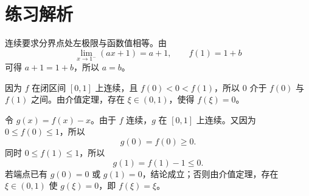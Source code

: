 \section{练习解析}

\begin{solutionbox}[title={第 1 题}]
连续要求分界点处左极限与函数值相等。由
\[
  \lim_{x\to 1^-}(ax+1)=a+1,\qquad f(1)=1+b
\]
可得 $a+1=1+b$，所以 $a=b$。
\end{solutionbox}

\begin{solutionbox}[title={第 2 题}]
因为 $f$ 在闭区间 $[0,1]$ 上连续，且 $f(0)<0<f(1)$，所以 $0$ 介于 $f(0)$ 与 $f(1)$ 之间。由介值定理，存在 $\xi\in(0,1)$，使得 $f(\xi)=0$。
\end{solutionbox}

\begin{solutionbox}[title={第 3 题}]
令 $g(x)=f(x)-x$。由于 $f$ 连续，$g$ 在 $[0,1]$ 上连续。又因为 $0\le f(0)\le 1$，所以
\[
  g(0)=f(0)\ge 0.
\]
同时 $0\le f(1)\le 1$，所以
\[
  g(1)=f(1)-1\le 0.
\]
若端点已有 $g(0)=0$ 或 $g(1)=0$，结论成立；否则由介值定理，存在 $\xi\in(0,1)$ 使 $g(\xi)=0$，即 $f(\xi)=\xi$。
\end{solutionbox}
